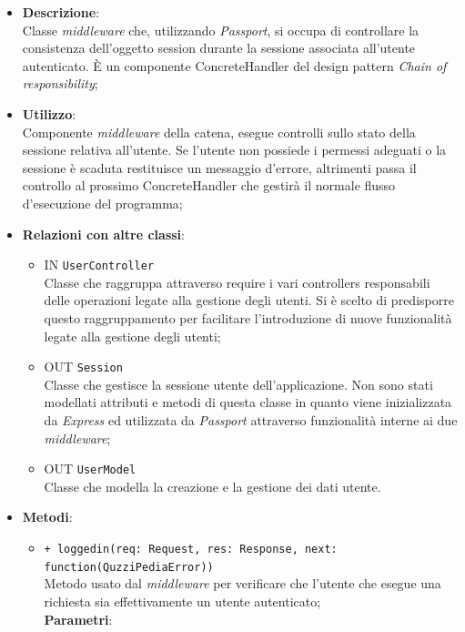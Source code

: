 \begin{itemize}
	\item 
	\textbf{Descrizione}:\\
	Classe \textit{middleware} che, utilizzando \textit{Passport}, si occupa di controllare la consistenza dell'oggetto session durante la sessione associata all'utente autenticato. È un componente ConcreteHandler del design pattern \textit{Chain of responsibility};
	\item
	\textbf{Utilizzo}:\\
	Componente \textit{middleware} della catena, esegue controlli sullo stato della sessione relativa all'utente. Se l'utente non possiede i permessi adeguati o la sessione è scaduta restituisce un messaggio d'errore, altrimenti passa il controllo al prossimo ConcreteHandler che gestirà il normale flusso d'esecuzione del programma;
	\item
	\textbf{Relazioni con altre classi}:
	\begin{itemize}
		\item
		IN \texttt{UserController} \\
		Classe che raggruppa attraverso require i vari controllers responsabili delle operazioni legate alla gestione degli utenti. Si è scelto di predisporre questo raggruppamento per facilitare l'introduzione di nuove funzionalità legate alla gestione degli utenti;
		\item
		OUT \texttt{Session} \\
		Classe che gestisce la sessione utente dell'applicazione. Non sono stati modellati attributi e metodi di questa classe in quanto viene inizializzata da \textit{Express} ed utilizzata da \textit{Passport} attraverso funzionalità interne ai due \textit{middleware};
		\item
		OUT \texttt{UserModel} \\
		Classe che modella la creazione e la gestione dei dati utente.
	\end{itemize}
	\item
	\textbf{Metodi}:
	\begin{itemize}
		\item
		\texttt{+ loggedin(req: Request, res: Response, next: function(QuzziPediaError))} \\
		Metodo usato dal \textit{middleware} per verificare che l'utente che esegue una richiesta sia effettivamente un utente autenticato; \\
		\textbf{Parametri}:
		 \begin{itemize}

\end{itemize}
\end{itemize}
\end{itemize}
